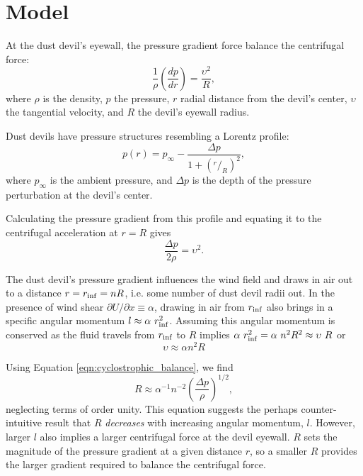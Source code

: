 \documentclass{aastex63}
\begin{document}
\section{Model} \label{sec:model}

At the dust devil's eyewall, the pressure gradient force balance the centrifugal force:
\begin{equation}
    \dfrac{1}{\rho}\left( \dfrac{dp}{dr} \right) = \dfrac{\upsilon^2}{R},
\end{equation}
where $\rho$ is the density, $p$ the pressure, $r$ radial distance from the devil's center, $\upsilon$ the tangential velocity, and $R$ the devil's eyewall radius. 

Dust devils have pressure structures resembling a Lorentz profile:
\begin{equation}
    p(r) = p_{\infty} - \dfrac{\Delta p}{1 + \left( ^r/_R \right)^2},\label{eqn:pressure_profile}
\end{equation}
where $p_{\infty}$ is the ambient pressure, and $\Delta p$ is the depth of the pressure perturbation at the devil's center.

Calculating the pressure gradient from this profile and equating it to the centrifugal acceleration at $r = R$ gives
\begin{equation}
    \dfrac{\Delta p}{2\rho} = \upsilon^2.\label{eqn:cyclostrophic_balance}
\end{equation}

The dust devil's pressure gradient influences the wind field and draws in air out to a distance $r = r_{\rm inf} = n R$, i.e. some number of dust devil radii out. In the presence of wind shear $\partial U/\partial x \equiv \alpha$, drawing in air from $r_{\rm inf}$ also brings in a specific angular momentum $l \approx \alpha\ r_{\rm inf}^2$. Assuming this angular momentum is conserved as the fluid travels from $r_{\rm inf}$ to $R$ implies $\alpha\ r_{\rm inf}^2 = \alpha\ n^2 R^2 \approx \upsilon\ R$ or 
\begin{equation}
    \upsilon \approx \alpha n^2 R
\end{equation}

Using Equation \ref{eqn:cyclostrophic_balance}, we find
\begin{equation}
    R \approx \alpha^{-1} n^{-2} \left( \dfrac{\Delta p}{\rho} \right)^{1/2},\label{eqn:R_vs_Delta-p}
\end{equation}
neglecting terms of order unity. This equation suggests the perhaps counter-intuitive result that $R$ \emph{decreases} with increasing angular momentum, $l$. However, larger $l$ also implies a larger centrifugal force at the devil eyewall. $R$ sets the magnitude of the pressure gradient at a given distance $r$, so a smaller $R$ provides the larger gradient required to balance the centrifugal force.
\end{document}
